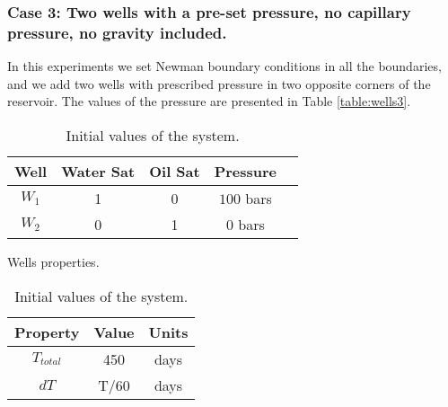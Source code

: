 \documentclass[12pt]{article}
\begin{document}
\subsubsection*{Case 3: Two wells with a pre-set pressure, no capillary pressure, no gravity included.}
In this experiments we set Newman boundary conditions in all the boundaries, and we add two wells with prescribed pressure in two opposite corners of the reservoir. The values of the pressure are presented in Table \ref{table:wells3}.
\begin{table}[!ht]
\hspace{-0cm}
\begin{minipage}{.5\textwidth}
\centering
\begin{tabular}{ |c|c|c|c|c|} 
\hline
Well&Water Sat&Oil Sat&Pressure\\
\hline
$W_1$&     1&    0 & $100$ bars \\  
$W_2$& 0& 1& $0$ bars\\
\hline
\end{tabular}
\caption{Wells properties.}\label{table:wells3}
\end{minipage}%
\begin{minipage}{.4\textwidth}
\centering
\begin{tabular}{ |c|c|c|} 
\hline
Property&Value&Units\\
\hline
    $T_{total}$&     450& days\\
$dT$& T/60&days\\
\hline
\end{tabular}\caption{Initial values of the system.}
\label{table:icw}
\end{minipage}
\hspace{1cm} 
\end{table} 
\end{document}
